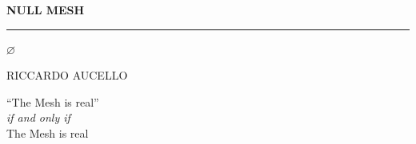 \documentclass[11pt,twoside,openright]{book}
\begin{document}

\cleardoublepage

\begin{titlepage}
\thispagestyle{empty}
\vspace*{2in}

\begin{center}
{\fontsize{48pt}{48pt}\selectfont\bfseries\color{nullmesh-dark}NULL MESH}

\vspace{0.5em}
{\color{nullmesh-accent}\rule{4in}{2pt}}

\vspace{2em}
{\fontsize{20}{20pt}\sffamily\color{nullmesh-gray} $\varnothing$}

\vfill

{\large\sffamily\color{nullmesh-dark}RICCARDO AUCELLO}

\vspace{1em}
{\small\sffamily\color{nullmesh-ghost}``The Mesh is real'' \\ \textit{if and only if} \\ The Mesh is real}
\end{center}
\end{titlepage}

\cleardoublepage

\frontmatter
\pagestyle{plain}



\clearpage


\clearpage


\mainmatter
\pagestyle{fancy}


\clearpage



\clearpage

\end{document}
